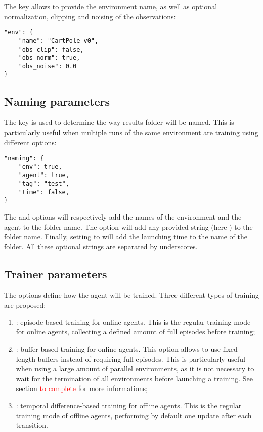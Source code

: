 The  key allows to provide the environment name, as well as optional normalization, clipping and noising of the observations:

\begin{verbatim}
"env": {
	"name": "CartPole-v0",
	"obs_clip": false,
	"obs_norm": true,
	"obs_noise": 0.0
}
\end{verbatim}

\subsection{Naming parameters}
\label{section:naming_parameters}

The  key is used to determine the way results folder will be named. This is particularly useful when multiple runs of the same environment are training using different options:

\begin{verbatim}
"naming": {
	"env": true,
	"agent": true,
	"tag": "test",
	"time": false,
}
\end{verbatim}

The  and  options will respectively add the names of the environment and the agent to the folder name. The  option will add any provided string (here ) to the folder name. Finally, setting  to  will add the launching time to the name of the folder. All these optional strings are separated by underscores.

\subsection{Trainer parameters}
\label{section:trainer_parameters}

The  options define how the agent will be trained. Three different types of training are proposed:

\begin{enumerate}
	\item {}: episode-based training for online agents. This is the regular training mode for online agents, collecting a defined amount of full episodes before training;
	\item {}: buffer-based training for online agents. This option allows to use fixed-length buffers instead of requiring full episodes. This is particularly useful when using a large amount of parallel environments, as it is not necessary to wait for the termination of all environments before launching a training. See section \textcolor{red}{to complete} for more informations;
	\item {}: temporal difference-based training for offline agents. This is the regular training mode of offline agents, performing by default one update after each transition.
\end{enumerate}

